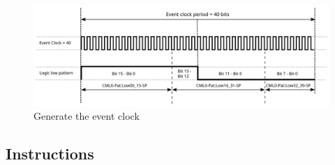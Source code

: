 \documentclass[12pt,a4paper]{article}
\begin{document}
\begin{figure}[H]
	\centering
	\includegraphics[width=\columnwidth]{./img/gen_evt_clk}
	\caption{Generate the event clock}
	\label{fig:gen_evt_clk}
\end{figure}

\subsection{Instructions}
\end{document}
